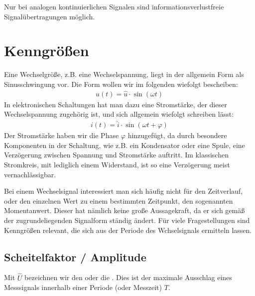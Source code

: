 \documentclass[letterpaper,10pt,english]{jupyterBook}
\begin{document}
\sphinxAtStartPar
Nur bei analogen kontinuierlichen Signalen sind informationsverlustfreie Signalübertragungen möglich.

\sphinxstepscope


\section{Kenngrößen}
\label{\detokenize{content/3_Kenngroessen:kenngroszen}}\label{\detokenize{content/3_Kenngroessen::doc}}
\sphinxAtStartPar
Eine Wechselgröße, z.B. eine Wechselspannung, liegt in der allgemein Form als Sinusschwingung vor. Die Form wollen wir im folgenden wiefolgt bescheiben:
\begin{equation*}
\begin{split}u(t) = \hat u \cdot \sin(\omega t)\end{split}
\end{equation*}
\sphinxAtStartPar
In elektronischen Schaltungen hat man dazu eine Stromstärke, der dieser Wechselspannung zugehörig ist, und sich allgemein wiefolgt schreiben lässt:
\begin{equation*}
\begin{split}i(t) = \hat i \cdot \sin(\omega t + \varphi)\end{split}
\end{equation*}
\sphinxAtStartPar
Der Stromstärke haben wir die Phase \(\varphi\) hinzugefügt, da durch besondere Komponenten in der Schaltung, wie z.B. ein Kondensator oder eine Spule, eine Verzögerung zwischen Spannung und Stromstärke auftritt. Im klassischen Stromkreis, mit lediglich einem Widerstand, ist so eine Verzögerung meist vernachlässigbar.

\sphinxAtStartPar
Bei einem Wechselsignal interessiert man sich häufig nicht für den Zeitverlauf, oder den einzelnen Wert zu einem bestimmten Zeitpunkt, den sogenannten Momentanwert. Dieser hat nämlich keine große Aussagekraft, da er sich gemäß der zugrundeliegenden Signalform ständig ändert. Für viele Fragestellungen sind Kenngrößen relevant, die sich aus der Periode des Wchselsignals ermitteln lassen.


\subsection{Scheitelfaktor / Amplitude}
\label{\detokenize{content/3_Kenngroessen:scheitelfaktor-amplitude}}
\sphinxAtStartPar
Mit \(\hat U\) bezeichnen wir den  oder die . Dies ist der maximale Ausschlag eines Messsignals innerhalb einer Periode (oder Messzeit) \(T\).
\end{document}
